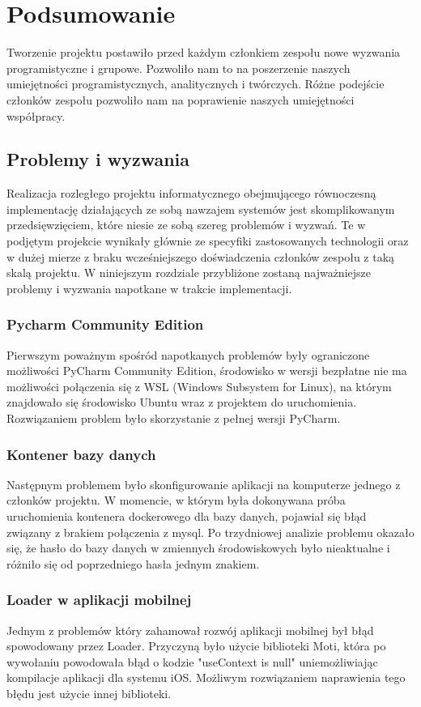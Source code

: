\chapter{Podsumowanie}

Tworzenie projektu postawiło przed każdym członkiem zespołu nowe wyzwania programistyczne i grupowe. Pozwoliło nam to na poszerzenie naszych umiejętności programistycznych, analitycznych i twórczych. Różne podejście członków zespołu pozwoliło nam na poprawienie naszych umiejętności współpracy.

\section{Problemy i wyzwania}
Realizacja rozległego projektu informatycznego obejmującego równoczesną implementację działających ze sobą nawzajem systemów jest skomplikowanym przedsięwzięciem, które niesie ze sobą szereg problemów i wyzwań. Te w podjętym projekcie wynikały głównie ze specyfiki zastosowanych technologii oraz w dużej mierze z braku wcześniejszego doświadczenia członków zespołu z taką skalą projektu. W niniejszym rozdziale przybliżone zostaną najważniejsze problemy i wyzwania napotkane w trakcie implementacji.

\subsection{Pycharm Community Edition}
Pierwszym poważnym spośród napotkanych problemów były ograniczone możliwości PyCharm Community Edition, środowisko w wersji bezpłatne nie ma możliwości połączenia się z WSL (Windows Subsystem for Linux), na którym znajdowało się środowisko Ubuntu wraz z projektem do uruchomienia. Rozwiązaniem problem było skorzystanie z pełnej wersji PyCharm.

\subsection{Kontener bazy danych}
Następnym problemem było skonfigurowanie aplikacji na komputerze jednego z członków projektu. W momencie, w którym była dokonywana próba uruchomienia kontenera dockerowego dla bazy danych, pojawiał się błąd związany z brakiem połączenia z mysql. Po trzydniowej analizie problemu okazało się, że hasło do bazy danych w zmiennych środowiskowych było nieaktualne i różniło się od poprzedniego hasła jednym znakiem.

\subsection{Loader w aplikacji mobilnej}
Jednym z problemów który zahamował rozwój aplikacji mobilnej był błąd spowodowany przez Loader. Przyczyną było użycie biblioteki Moti, która po wywołaniu powodowała błąd o kodzie "useContext is null" uniemożliwiając kompilacje aplikacji dla systemu iOS. Możliwym rozwiązaniem naprawienia tego błędu jest użycie innej biblioteki.

